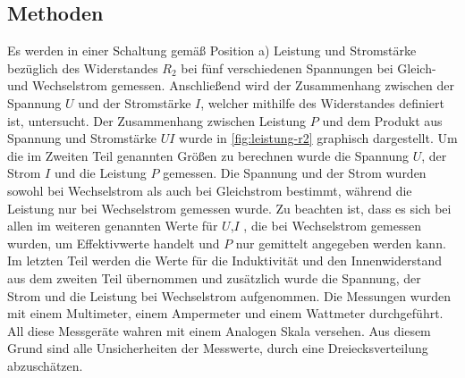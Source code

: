 \subsection{Methoden}\label{kap:MethodenS}
Es werden in einer Schaltung gemäß Position a) Leistung und Stromstärke bezüglich des Widerstandes $R_2$ bei fünf verschiedenen Spannungen bei Gleich- und Wechselstrom gemessen.
Anschließend wird der Zusammenhang zwischen der Spannung $U$ und der Stromstärke $I$, welcher mithilfe des Widerstandes definiert ist, untersucht.
Der Zusammenhang zwischen Leistung $P$ und dem Produkt aus Spannung und Stromstärke $UI$ wurde in \cref{fig:leistung-r2} graphisch dargestellt.
Um die im Zweiten Teil genannten Größen zu berechnen wurde die Spannung $U$, der Strom $I$ und die Leistung $P$ gemessen. 
Die Spannung und der Strom wurden sowohl bei Wechselstrom als auch bei Gleichstrom bestimmt, während die Leistung nur bei Wechselstrom gemessen wurde. Zu beachten ist, dass es sich bei allen im weiteren genannten Werte für $U$,$I$ , die bei Wechselstrom gemessen wurden, um Effektivwerte handelt und $P$ nur gemittelt angegeben werden kann.
Im letzten Teil werden die Werte für die Induktivität und den Innenwiderstand aus dem zweiten Teil übernommen und zusätzlich wurde die Spannung, der Strom und die Leistung bei Wechselstrom aufgenommen.
Die Messungen wurden mit einem Multimeter, einem Ampermeter und einem Wattmeter durchgeführt.
All diese Messgeräte wahren mit einem Analogen Skala versehen. Aus diesem Grund sind alle Unsicherheiten der Messwerte, durch eine Dreiecksverteilung abzuschätzen. 
